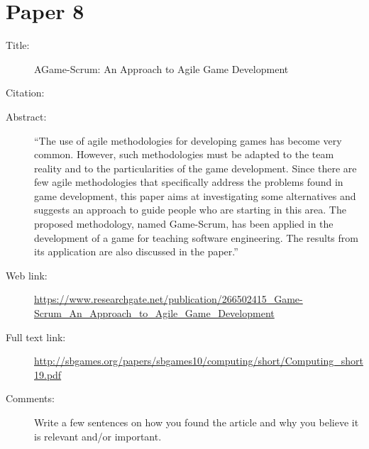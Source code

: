 \documentclass{scrartcl}
\begin{document}
\section*{Paper 8}
\begin{description}
\item[Title:] AGame-Scrum: An Approach to Agile Game Development
\item[Citation:] \cite{bibtex_key}
\item[Abstract:] ``The use of agile methodologies for developing games has become very common. However, such methodologies must be adapted to the team reality and to the particularities of the game development. Since there are few agile methodologies that specifically address the problems found in game development, this paper aims at investigating some alternatives and suggests an approach to guide people who are starting in this area. The proposed methodology, named Game-Scrum, has been applied in the development of a game for teaching software engineering. The results from its application are also discussed in the paper.''
\item[Web link:] \url{https://www.researchgate.net/publication/266502415_Game-Scrum_An_Approach_to_Agile_Game_Development}
\item[Full text link:] \url{http://sbgames.org/papers/sbgames10/computing/short/Computing_short19.pdf}
\item[Comments:] Write a few sentences on how you found the article and why you believe it is relevant and/or important.
\end{description}




\end{document}
